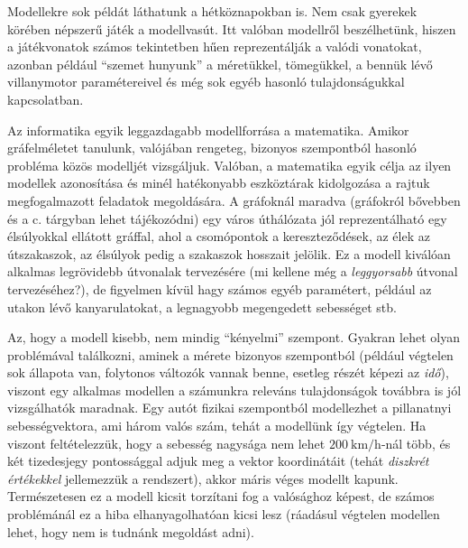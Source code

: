 \begin{pelda}
	Modellekre sok példát láthatunk a hétköznapokban is. Nem csak gyerekek körében népszerű játék a modellvasút. Itt valóban modellről beszélhetünk, hiszen a játékvonatok számos tekintetben hűen reprezentálják a valódi vonatokat, azonban például ``szemet hunyunk'' a méretükkel, tömegükkel, a bennük lévő villanymotor paramétereivel és még sok egyéb hasonló tulajdonságukkal kapcsolatban.

	Az informatika egyik leggazdagabb modellforrása a matematika. Amikor gráfelméletet tanulunk, valójában rengeteg, bizonyos szempontból hasonló probléma közös modelljét vizsgáljuk. Valóban, a matematika egyik célja az ilyen modellek azonosítása és minél hatékonyabb eszköztárak kidolgozása a rajtuk megfogalmazott feladatok megoldására. A gráfoknál maradva (gráfokról bővebben  és a \bszketto c. tárgyban lehet tájékozódni) egy város úthálózata jól reprezentálható egy élsúlyokkal ellátott gráffal, ahol a csomópontok a kereszteződések, az élek az útszakaszok, az élsúlyok pedig a szakaszok hosszait jelölik. Ez a modell kiválóan alkalmas legrövidebb útvonalak tervezésére (mi kellene még a \emph{leggyorsabb} útvonal tervezéséhez?), de figyelmen kívül hagy számos egyéb paramétert, például az utakon lévő kanyarulatokat, a legnagyobb megengedett sebességet stb.
\end{pelda}

\begin{megjegyzes}
	Az, hogy a modell kisebb, nem mindig ``kényelmi'' szempont. Gyakran lehet olyan problémával találkozni, aminek a mérete bizonyos szempontból  (például végtelen sok állapota van, folytonos változók vannak benne, esetleg részét képezi az \emph{idő}), viszont egy alkalmas  modellen a számunkra releváns tulajdonságok továbbra is jól vizsgálhatók maradnak. Egy autót fizikai szempontból modellezhet a pillanatnyi sebességvektora, ami három valós szám, tehát a modellünk így végtelen. Ha viszont feltételezzük, hogy a sebesség nagysága nem lehet $200~\textrm{km/h}$-nál több, és két tizedesjegy pontossággal adjuk meg a vektor koordinátáit (tehát \emph{diszkrét értékekkel} jellemezzük a rendszert), akkor máris véges modellt kapunk. Természetesen ez a modell kicsit torzítani fog a valósághoz képest, de számos problémánál ez a hiba elhanyagolhatóan kicsi lesz (ráadásul végtelen modellen lehet, hogy nem is tudnánk megoldást adni).
\end{megjegyzes}


